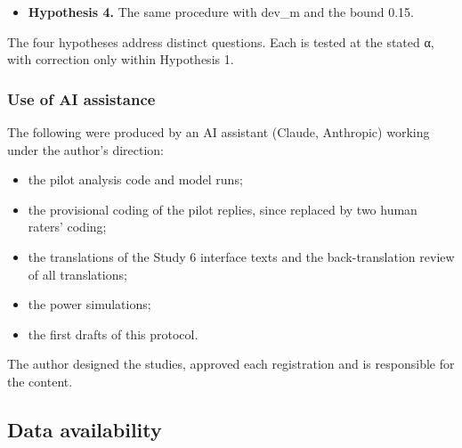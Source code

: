 \documentclass[
  11pt,
]{article}
\providecommand{\tightlist}{%
  \setlength{\itemsep}{0pt}\setlength{\parskip}{0pt}}
\begin{document}
\begin{itemize}
  \begin{itemize}
  \tightlist
  \item
    Supported: significant and positive.
  \item
    Contradicted: significant and negative.
  \item
    No meaningful effect: the mean is significantly below 0.20.
  \item
    Otherwise inconclusive.
  \item
    Planned robustness checks: a Wilcoxon signed-rank test, and each
    model's bootstrap interval over capacities as in the pilot.
  \end{itemize}
\item
  \textbf{Hypothesis 4.} The same procedure with dev\_m and the bound
  0.15.
\end{itemize}

The four hypotheses address distinct questions. Each is tested at the
stated α, with correction only within Hypothesis 1.

\hypertarget{use-of-ai-assistance}{%
\subsubsection{Use of AI assistance}\label{use-of-ai-assistance}}

The following were produced by an AI assistant (Claude, Anthropic)
working under the author's direction:

\begin{itemize}
\tightlist
\item
  the pilot analysis code and model runs;
\item
  the provisional coding of the pilot replies, since replaced by two
  human raters' coding;
\item
  the translations of the Study 6 interface texts and the
  back-translation review of all translations;
\item
  the power simulations;
\item
  the first drafts of this protocol.
\end{itemize}

The author designed the studies, approved each registration and is
responsible for the content.

\hypertarget{data-availability}{%
\subsection{Data availability}\label{data-availability}}
\end{document}
